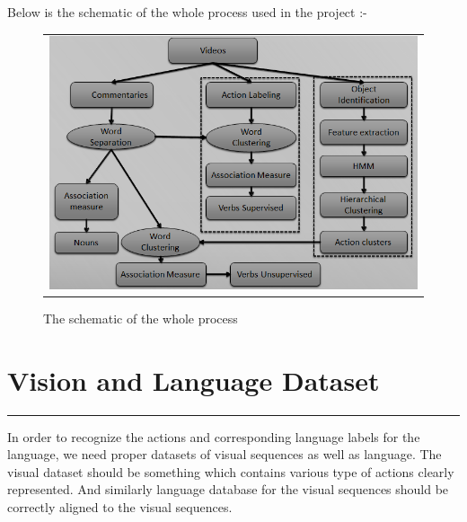 \def\DevnagVersion{2.15}\documentclass[a4paper, 11pt, notitlepage]{report}
\begin{document}
Below is the schematic of the whole process used in the project :-

\begin{figure}[h]
\center
\begin{tabular}{c}
\includegraphics[scale=0.5]{schematic1.png}
\end{tabular}
\label{tab:gt}
\caption{The schematic of the whole process}
\end{figure}


\chapter{Vision and Language Dataset }
\hrule height 2pt
\vspace*{10pt} 
In order to recognize the actions and corresponding language labels for the language, we need proper datasets of visual sequences as well as language. The visual dataset should be something which contains various type of actions clearly represented. And similarly language database for the visual sequences should be correctly aligned to the visual sequences.
\end{document}
